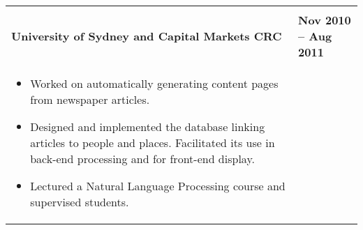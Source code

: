 \documentclass[]{article}
\begin{document}
\begin{table*}[h!]
\begin{tabular}[h!]{p{12.7cm}l}


& \\

\textbf{University of Sydney and Capital Markets CRC} & \textbf{Nov 2010 -- Aug 2011}\\
\begin{itemize}[noitemsep,topsep=0pt]
\item {Worked on automatically generating content pages from newspaper articles.}
\item {Designed and implemented the database linking articles to people and places. Facilitated its use in back-end processing and for front-end display.}
\item {Lectured a Natural Language Processing course and supervised students.}
\end{itemize}
& \\


\end{tabular}
\end{table*}
\end{document}
